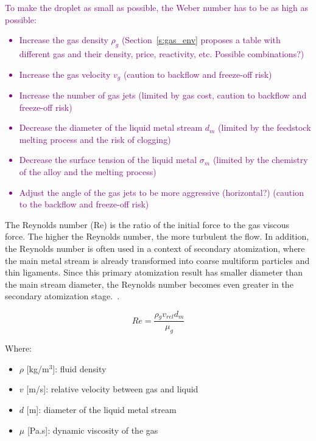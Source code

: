 \documentclass[../main]{subfiles}
\begin{document}
\textcolor{Purple}{To make the droplet as small as possible, the Weber number has to be as high as possible:
\begin{itemize}
    \item Increase the gas density $\rho_g$ (Section~\ref{s:gas_env} proposes a table with different gas and their density, price, reactivity, etc. Possible combinations?)
    \item Increase the gas velocity $v_g$ (caution to backflow and freeze-off risk)
    \item Increase the number of gas jets (limited by gas cost, caution to backflow and freeze-off risk)
    \item Decrease the diameter of the liquid metal stream $d_m$ (limited by the feedstock melting process and the risk of clogging)
    \item Decrease the surface tension of the liquid metal $\sigma_m$ (limited by the chemistry of the alloy and the melting process)
    \item Adjust the angle of the gas jets to be more aggressive (horizontal?) (caution to the backflow and freeze-off risk)
\end{itemize}}

The Reynolds number (Re) is the ratio of the initial force to the gas viscous force. The higher the Reynolds number, the more turbulent the flow. In addition, the Reynolds number is often used in a context of secondary atomization, where the main metal stream is already transformed into coarse multiform particles and thin ligaments. Since this primary atomization result has smaller diameter than the main stream diameter, the Reynolds number becomes even greater in the secondary atomization stage.~\cite{Ridolfi2020NumericalModeling,DErricoDESIGNEXPERIMENTAL}.

\vspace{0mm}
\begin{equation}
Re = \frac{\rho{_g} v_{rel} d_{m}}{\mu_{g}}
\label{e:reynolds_number}
\end{equation}
\vspace{0mm}

\vspace{0mm}
\begin{minipage}{\linewidth}
Where:
\begin{itemize}
    \item[] $\rho$ [kg/m$^{3}$]: fluid density
    \item[] $v$ [m/s]: relative velocity between gas and liquid
    \item[] $d$ [m]: diameter of the liquid metal stream
    \item[] $\mu$ [Pa.s]: dynamic viscosity of the gas
\end{itemize}
\end{minipage}
\vspace{2mm}
\end{document}
